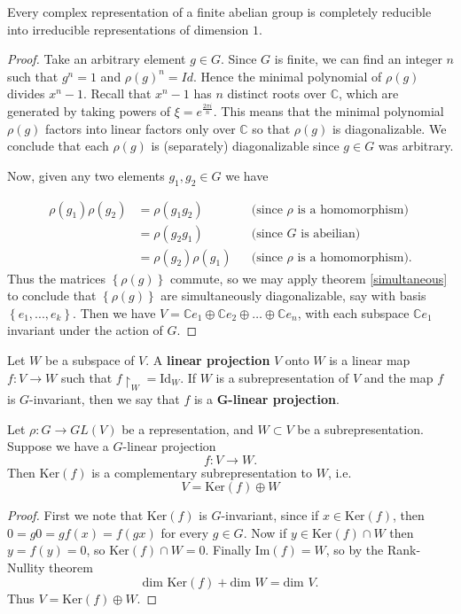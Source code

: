 \begin{thm} Every complex representation of a finite abelian group is completely reducible into irreducible representations of dimension $1$.  
\end {thm}
\begin{proof}
Take an arbitrary element $g \in G$.  Since $G$ is finite, we can find an integer $n$ such that $g^n = 1$ and $\rho(g)^n = Id$.    Hence the minimal polynomial of $\rho(g)$ divides  $x^n -1$.  Recall that $x^n-1$ has $n$ distinct roots over $\mathbb{C}$, which are generated by taking powers of $\xi = e^{\frac{2 \pi i}{n}}$.  This means that the minimal polynomial $\rho(g)$ factors into linear factors only over $\mathbb{C}$ so that $\rho(g)$ is diagonalizable.  We conclude that each $\rho(g)$ is (separately) diagonalizable since $g \in G$ was arbitrary.

Now, given any two elements $g_1, g_2 \in G$ we have 

\begin{align*}
\rho(g_1) \rho(g_2)&= \rho(g_1 g_2)&& \text{(since $\rho$ is a homomorphism)} \\
		&=  \rho(g_2 g_1) && \text{(since $G$ is abeilian)} \\
		&= \rho(g_2) \rho(g_1) && \text{(since $\rho$ is a homomorphism)}.
\end{align*}
Thus the matrices $\left\{ \rho(g)\right\}$ commute, so we may apply theorem \ref{simultaneous} to conclude that $\left\{ \rho(g)\right\}$ are simultaneously diagonalizable, say with basis $\left\{ e_1, ..., e_k \right\}$.  Then we have $V= \mathbb{C}e_1 \oplus \mathbb{C} e_2 \oplus \ldots \oplus \mathbb{C} e_n$, with each subspace $ \mathbb{C}e_1$ invariant under the action of $G$.
\end{proof}

\begin{defn}
Let $W$ be a subspace of $V$.  A \textbf{linear projection} $V$ onto $W$ is a linear map $f \colon V \to W$ such that $f \restriction_{W} = \text{Id}_W$.  If $W$ is a subrepresentation of $V$ and the map $f$ is $G$-invariant, then we say that $f$ is a $\mathbf{G}$\textbf{-linear projection}.
\end{defn}

\begin{lemma} \label{maschke-lemma}
Let $\rho \colon G \to GL(V)$ be a representation, and $W \subset V$ be a subrepresentation.  Suppose we have a $G$-linear projection 
\[ f \colon V \to W. \]
Then $\text{Ker}(f)$ is a complementary subrepresentation to $W$, i.e.
\[ V = \text{Ker}(f) \oplus W \]
\end{lemma}
\begin{proof}
First we note that $\text{Ker}(f)$ is $G$-invariant, since if $x \in \text{Ker}(f)$, then $0 = g0 = g f(x) = f(gx)$ for every $g \in G$.
Now if $y \in \text{Ker}(f) \cap W$ then $y=f(y)=0$, so $\text{Ker}(f) \cap W = 0$.  Finally $\text{Im}(f)=W$, so by the Rank-Nullity theorem
\[ \text{dim Ker}(f) + \text{dim }W = \text{dim }V. \]
Thus $V = \text{Ker}(f) \oplus W$.  
\end{proof}

